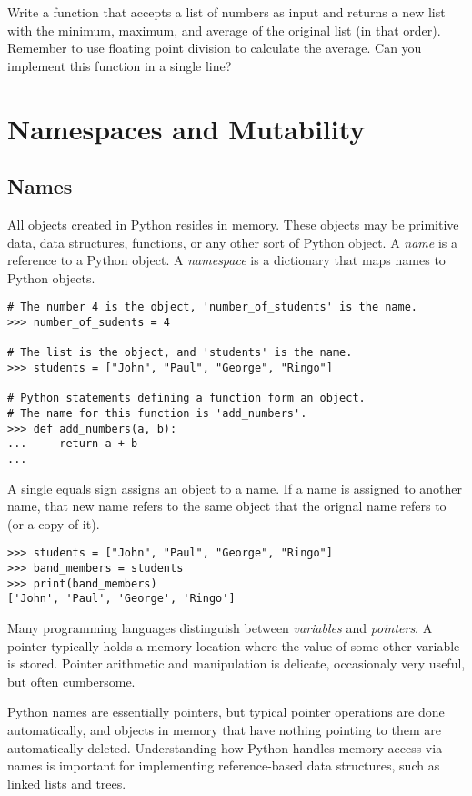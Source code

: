 \begin{problem}
Write a function that accepts a list of numbers as input and returns a new list with the minimum, maximum, and average of the original list (in that order).
Remember to use floating point division to calculate the average.
Can you implement this function in a single line?
\end{problem}

\section*{Namespaces and Mutability}

\subsection*{Names}
All objects created in Python resides in memory.
These objects may be primitive data, data structures, functions, or any other sort of Python object.
A \emph{name} is a reference to a Python object.
A \emph{namespace} is a dictionary that maps names to Python objects.

\begin{lstlisting}
# The number 4 is the object, 'number_of_students' is the name.
>>> number_of_sudents = 4

# The list is the object, and 'students' is the name.
>>> students = ["John", "Paul", "George", "Ringo"]

# Python statements defining a function form an object.
# The name for this function is 'add_numbers'.
>>> def add_numbers(a, b):
...     return a + b
... 
\end{lstlisting}

A single equals sign assigns an object to a name.
If a name is assigned to another name, that new name refers to the same object that the orignal name refers to (or a copy of it).

\begin{lstlisting}
>>> students = ["John", "Paul", "George", "Ringo"]
>>> band_members = students
>>> print(band_members)
['John', 'Paul', 'George', 'Ringo']
\end{lstlisting}

\begin{info}
Many programming languages distinguish between \emph{variables} and \emph{pointers}.
A pointer typically holds a memory location where the value of some other variable is stored.
Pointer arithmetic and manipulation is delicate, occasionaly very useful, but often cumbersome.

Python names are essentially pointers, but typical pointer operations are done automatically, and objects in memory that have nothing pointing to them are automatically deleted.
Understanding how Python handles memory access via names is important for implementing reference-based data structures, such as linked lists and trees.
\end{info}

